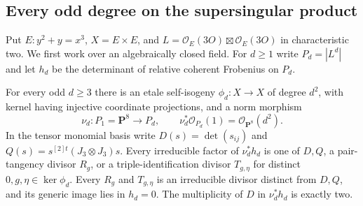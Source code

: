 \subsection{Every odd degree on the supersingular product}
\label{subsec:ss-all-odd-groups}

Put $E:y^2+y=x^3$, $X=E\times E$, and
$L=\mathcal O_E(3O)\boxtimes\mathcal O_E(3O)$ in characteristic two.
We first work over an algebraically closed field.
For $d\ge1$ write $P_d=|L^d|$ and let $h_d$ be the determinant of
relative coherent Frobenius on $P_d$.

\begin{lemma}
\label{lem:ss-all-odd-norm-factors}
For every odd $d\ge3$ there is an etale self-isogeny
$\phi_d:X\to X$ of degree $d^2$, with kernel having injective
coordinate projections, and a norm morphism
\[
 \nu_d:P_1=\mathbf P^8\longrightarrow P_d,
 \qquad \nu_d^*\mathcal O_{P_d}(1)=\mathcal O_{\mathbf P^8}(d^2).
\]
In the tensor monomial basis write
$D(s)=\det(s_{ij})$ and
$Q(s)=s^{[2]t}(J_3\otimes J_3)s$.
Every irreducible factor of $\nu_d^*h_d$ is one of $D,Q$, a
pair-tangency divisor $R_g$, or a triple-identification divisor
$T_{g,\eta}$ for distinct $0,g,\eta\in\ker\phi_d$.
Every $R_g$ and $T_{g,\eta}$ is an irreducible divisor distinct
from $D,Q$, and its generic image lies in $h_d=0$.
The multiplicity of $D$ in $\nu_d^*h_d$ is exactly two.
\end{lemma}


